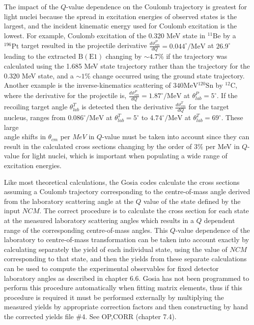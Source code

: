 \documentclass[10pt]{article}
\begin{document}
The impact of the $Q$-value dependence on the Coulomb trajectory is greatest for light nuclei because the spread in excitation energies of observed states is the largest, and the incident kinematic energy used for Coulomb excitation is the lowest. For example, Coulomb excitation of the 0.320 MeV state in ${ }^{11} \mathrm{Be}$ by a ${ }^{196} \mathrm{Pt}$ target resulted in the projectile derivative $\frac{d \vartheta_{c m}^{P}}{d Q}=0.044^{\circ} / \mathrm{MeV}$ at $26.9^{\circ}$ leading to the extracted $\mathrm{B}(\mathrm{E} 1)$ changing by $\sim 4.7 \%$ if the trajectory was calculated using the 1.685 MeV state trajectory rather than the trajectory for the 0.320 MeV state, and a $\sim 1 \%$ change occurred using the ground state trajectory. Another example is the inverse-kinematics scattering of $340 \mathrm{MeV}{ }^{120} \mathrm{Sn}$ by ${ }^{12} \mathrm{C}$, where the derivative for the projectile is, $\frac{d \vartheta_{c m}^{P}}{d Q}=1.87^{\circ} / \mathrm{MeV}$ at $\theta_{l a b}^{P}=5^{\circ}$. If the recoiling target angle $\theta_{l a b}^{T}$ is detected then the derivative $\frac{d \vartheta_{c m}^{T}}{d Q}$ for the target nucleus, ranges from $0.086^{\circ} / \mathrm{MeV}$ at $\theta_{l a b}^{T}=5^{\circ}$ to $4.74^{\circ} / \mathrm{MeV}$ at $\theta_{l a b}^{T}=69^{\circ}$. These large\\
angle shifts in $\theta_{c m}$ per $M e V$ in $Q$-value must be taken into account since they can result in the calculated cross sections changing by the order of $3 \%$ per MeV in $Q$-value for light nuclei, which is important when populating a wide range of excitation energies.

Like most theoretical calculations, the Gosia codes calculate the cross sections assuming a Coulomb trajectory corresponding to the centre-of-mass angle derived from the laboratory scattering angle at the $Q$ value of the state defined by the input $N C M$. The correct procedure is to calculate the cross section for each state at the measured laboratory scattering angles which results in a $Q$ dependent range of the corresponding centre-of-mass angles. This $Q$-value dependence of the laboratory to centre-of-mass transformation can be taken into account exactly by calculating separately the yield of each individual state, using the value of $N C M$ corresponding to that state, and then the yields from these separate calculations can be used to compute the experimental observables for fixed detector laboratory angles as described in chapter 6.6. Gosia has not been programmed to perform this procedure automatically when fitting matrix elements, thus if this procedure is required it must be performed externally by multiplying the measured yields by appropriate correction factors and then constructing by hand the corrected yields file \#4. See OP,CORR (chapter 7.4).
\end{document}
